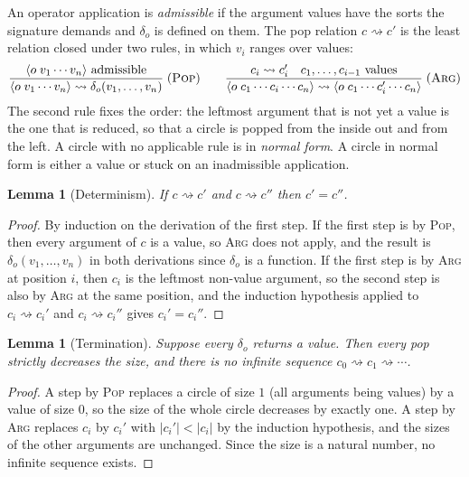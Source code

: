 \documentclass[11pt]{article}
\theoremstyle{plain}
\newtheorem{lemma}[theorem]{Lemma}
\theoremstyle{definition}
\theoremstyle{remark}
\newcommand{\red}{\rightsquigarrow}
\newcommand{\cir}[2]{\langle #1\;#2\rangle}
\begin{document}
An operator application is \emph{admissible} if the argument values have the sorts the signature demands and $\delta_o$ is defined on them. The pop relation $c \red c'$ is the least relation closed under two rules, in which $v_i$ ranges over values:
\[
\dfrac{\cir{o}{v_1\cdots v_n}\text{ admissible}}{\cir{o}{v_1\cdots v_n}\red \delta_o(v_1,\ldots,v_n)}\;(\textsc{Pop})
\qquad
\dfrac{c_i\red c_i'\quad c_1,\ldots,c_{i-1}\text{ values}}{\cir{o}{c_1\cdots c_i\cdots c_n}\red\cir{o}{c_1\cdots c_i'\cdots c_n}}\;(\textsc{Arg})
\]
The second rule fixes the order: the leftmost argument that is not yet a value is the one that is reduced, so that a circle is popped from the inside out and from the left. A circle with no applicable rule is in \emph{normal form}. A circle in normal form is either a value or stuck on an inadmissible application.

\begin{lemma}[Determinism]\label{lem:det}
If $c\red c'$ and $c\red c''$ then $c'=c''$.
\end{lemma}

\begin{proof}
By induction on the derivation of the first step. If the first step is by \textsc{Pop}, then every argument of $c$ is a value, so \textsc{Arg} does not apply, and the result is $\delta_o(v_1,\ldots,v_n)$ in both derivations since $\delta_o$ is a function. If the first step is by \textsc{Arg} at position $i$, then $c_i$ is the leftmost non-value argument, so the second step is also by \textsc{Arg} at the same position, and the induction hypothesis applied to $c_i\red c_i'$ and $c_i\red c_i''$ gives $c_i'=c_i''$. \qedhere
\end{proof}

\begin{lemma}[Termination]\label{lem:term}
Suppose every $\delta_o$ returns a value. Then every pop strictly decreases the size, and there is no infinite sequence $c_0\red c_1\red\cdots$.
\end{lemma}

\begin{proof}
A step by \textsc{Pop} replaces a circle of size $1$ (all arguments being values) by a value of size $0$, so the size of the whole circle decreases by exactly one. A step by \textsc{Arg} replaces $c_i$ by $c_i'$ with $|c_i'|<|c_i|$ by the induction hypothesis, and the sizes of the other arguments are unchanged. Since the size is a natural number, no infinite sequence exists. \qedhere
\end{proof}
\end{document}
